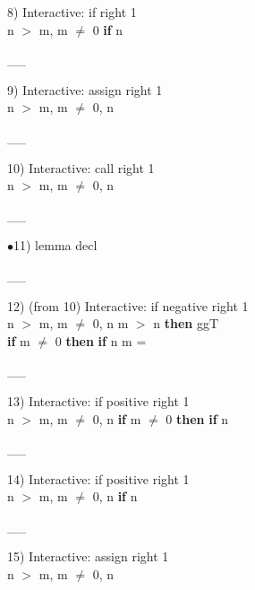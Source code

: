 \documentclass[a4paper]{article}
\begin{document}
8) Interactive: if right  1\\
n $>$ m, m $\neq$ 0 \Fol \Do 
{\bf if} n %

\vspace{-1.5ex}\_\hrulefill \_

9) Interactive: assign right  1\\
n $>$ m, m $\neq$ 0, n %

\vspace{-1.5ex}\_\hrulefill \_

10) Interactive: call right  1\\
n $>$ m, m $\neq$ 0, n %

\vspace{-1.5ex}\_\hrulefill \_

$\bullet$11) lemma decl \\
 \Fol 

\vspace{-1.5ex}\_\hrulefill \_

12)  (from 10) Interactive: if negative right  1\\
\tabf n $>$ m, m $\neq$ 0, n %
\Fol {} m $>$ n {\bf then} ggT \\
 \tabf {} {\bf if} m $\neq$ 0 {\bf then} {\bf if} n %
m = 

\vspace{-1.5ex}\_\hrulefill \_

13) Interactive: if positive right  1\\
\tabf n $>$ m, m $\neq$ 0, n %
\Fol \Do 
{\bf if} m $\neq$ 0 {\bf then} 
{\bf if} n %

\vspace{-1.5ex}\_\hrulefill \_

14) Interactive: if positive right  1\\
n $>$ m, m $\neq$ 0, n %
{\bf if} n %

\vspace{-1.5ex}\_\hrulefill \_

15) Interactive: assign right  1\\
n $>$ m, m $\neq$ 0, n %
\end{document}

